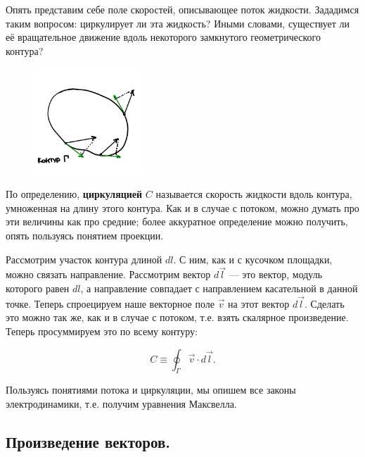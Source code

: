 \documentclass[a4paper,12pt]{article}
\numberwithin{equation}{section}
\begin{document}
Опять представим себе поле скоростей, описывающее поток
жидкости. Зададимся таким вопросом: циркулирует ли эта жидкость? Иными
словами, существует ли её вращательное движение вдоль некоторого
замкнутого геометрического контура? 

\begin{figure}
  \vspace{-1.5cm}
  \begin{center}
    \includegraphics[width=4cm,height=4cm]{curl.pdf}
  \end{center}
  \vspace{-0.7cm}
  \label{fig:curl}
\end{figure}


По определению, \textbf{циркуляцией} $C$ называется скорость жидкости вдоль
контура, умноженная на длину этого контура. Как и в случае с потоком,
можно думать про эти величины как про средние; более аккуратное
определение можно получить, опять пользуясь понятием проекции. 

Рассмотрим участок контура длиной $dl$. С ним, как и с кусочком
площадки, можно связать направление. Рассмотрим вектор $d\vec{l}$ ---
это вектор, модуль которого равен $dl$, а направление совпадает с
направлением касательной в данной точке. Теперь спроецируем наше
векторное поле $\vec{v}$ на этот вектор $d\vec{l}$. Сделать это можно
так же, как и в случае с потоком, т.е. взять скалярное
произведение. Теперь просуммируем это по всему контуру:

\begin{equation}
  \label{eq:curl}
  C \equiv \oint_\Gamma \vec{v} \cdot d \vec{l}.
\end{equation}

Пользуясь понятиями потока и циркуляции, мы опишем все законы
электродинамики, т.е. получим уравнения Максвелла. 

\subsection{Произведение векторов.}
\label{sec:vector_product}
\end{document}
